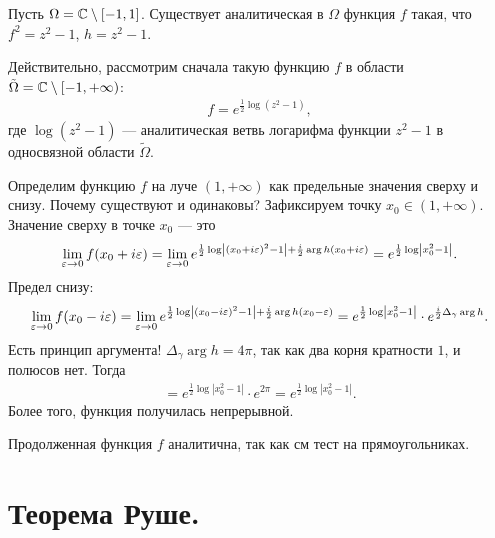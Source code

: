 \documentclass[../complex-analysis.tex]{subfiles}
\begin{document}
\begin{exmpl}
 Пусть $ \Omega = \mathbb{C} \setminus [-1, 1] $. Существует аналитическая в $ \Omega $ функция $ f $ такая, что $ f^{2} = z^{2} - 1 $, $ h = z^{2}-1 $.

 Действительно,  рассмотрим сначала такую функцию $ f $ в области $ \tilde \Omega  = \mathbb{C} \setminus [-1, +\infty)$:
 \begin{align*}
  f = e^{\frac{1}{2}\log(z^{2} - 1)},
 \end{align*} где $ \log(z^{2} - 1) $ --- аналитическая ветвь логарифма функции $ z^{2}-1 $ в односвязной области $ \tilde \Omega $.

 Определим функцию $ f $ на луче $ (1, +\infty) $ как предельные значения сверху и снизу. Почему существуют и одинаковы? Зафиксируем точку $ x_0 \in (1, +\infty) $. Значение сверху в точке $ x_0 $ --- это
 \begin{align*}
  \lim_{\varepsilon \to 0} f(x_0 + i\varepsilon) = \lim_{\varepsilon \to 0} e^{\frac{1}{2}\log \left| (x_0+i\varepsilon)^{2} - 1 \right| + \frac{i}{2}\arg h(x_0 + i\varepsilon)} = e^{\frac{1}{2}\log \left| x_0^{2}-1 \right|}.
 \end{align*} Предел снизу:
 \begin{align*}
  \lim_{\varepsilon \to 0} f(x_0 - i\varepsilon) = \lim_{\varepsilon \to 0} e^{\frac{1}{2} \log \left| (x_0 -i\varepsilon)^{2}-1 \right| + \frac{i}{2}\arg h(x_0-\varepsilon)} = e^{\frac{1}{2} \log \left| x_0^{2}-1 \right|} \cdot e^{\frac{i}{2} \Delta_\gamma \arg h}.
 \end{align*} Есть принцип аргумента! $ \Delta_{\gamma} \arg h = 4\pi $, так как два корня кратности $ 1 $, и полюсов нет. Тогда
 \begin{align*}
  = e^{\frac{1}{2}\log \left| x_0^{2}-1 \right|} \cdot e^{2\pi} = e^{\frac{1}{2} \log \left| x_0^{2}-1 \right|}.
 \end{align*} Более того, функция получилась непрерывной.

 Продолженная функция $ f $ аналитична, так как см тест на прямоугольниках.
\end{exmpl}

\newpage
\section{Теорема Руше.}
\end{document}
